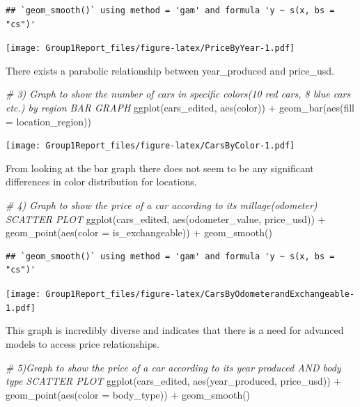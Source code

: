 \documentclass[
]{article}
\newenvironment{Shaded}{\begin{snugshade}}{\end{snugshade}}
\newcommand{\AttributeTok}[1]{\textcolor[rgb]{0.77,0.63,0.00}{#1}}
\newcommand{\CommentTok}[1]{\textcolor[rgb]{0.56,0.35,0.01}{\textit{#1}}}
\newcommand{\FunctionTok}[1]{\textcolor[rgb]{0.00,0.00,0.00}{#1}}
\newcommand{\NormalTok}[1]{#1}
\newcommand{\SpecialCharTok}[1]{\textcolor[rgb]{0.00,0.00,0.00}{#1}}
\begin{document}
\begin{verbatim}
## `geom_smooth()` using method = 'gam' and formula 'y ~ s(x, bs = "cs")'
\end{verbatim}

\texttt{[image: Group1Report\_files/figure-latex/PriceByYear-1.pdf]}

There exists a parabolic relationship between year\_produced and
price\_usd.

\begin{Shaded}
\begin{Highlighting}[]
\CommentTok{\# 3) Graph to show the number of cars in specific colors(10 red cars, 8 blue cars etc.) by region BAR GRAPH}
\FunctionTok{ggplot}\NormalTok{(cars\_edited, }\FunctionTok{aes}\NormalTok{(color)) }\SpecialCharTok{+} \FunctionTok{geom\_bar}\NormalTok{(}\FunctionTok{aes}\NormalTok{(}\AttributeTok{fill =}\NormalTok{ location\_region))}
\end{Highlighting}
\end{Shaded}

\texttt{[image: Group1Report\_files/figure-latex/CarsByColor-1.pdf]}

From looking at the bar graph there does not seem to be any significant
differences in color distribution for locations.

\begin{Shaded}
\begin{Highlighting}[]
\CommentTok{\# 4) Graph to show the price of a car according to its millage(odometer) SCATTER PLOT}
\FunctionTok{ggplot}\NormalTok{(cars\_edited, }\FunctionTok{aes}\NormalTok{(odometer\_value, price\_usd)) }\SpecialCharTok{+} \FunctionTok{geom\_point}\NormalTok{(}\FunctionTok{aes}\NormalTok{(}\AttributeTok{color =}\NormalTok{ is\_exchangeable)) }\SpecialCharTok{+} \FunctionTok{geom\_smooth}\NormalTok{()}
\end{Highlighting}
\end{Shaded}

\begin{verbatim}
## `geom_smooth()` using method = 'gam' and formula 'y ~ s(x, bs = "cs")'
\end{verbatim}

\texttt{[image: Group1Report\_files/figure-latex/CarsByOdometerandExchangeable-1.pdf]}

This graph is incredibly diverse and indicates that there is a need for
advanced models to access price relationships.

\begin{Shaded}
\begin{Highlighting}[]
\CommentTok{\# 5)Graph to show the price of a car according to its year produced AND body type SCATTER PLOT}
\FunctionTok{ggplot}\NormalTok{(cars\_edited, }\FunctionTok{aes}\NormalTok{(year\_produced, price\_usd)) }\SpecialCharTok{+} \FunctionTok{geom\_point}\NormalTok{(}\FunctionTok{aes}\NormalTok{(}\AttributeTok{color =}\NormalTok{ body\_type)) }\SpecialCharTok{+} \FunctionTok{geom\_smooth}\NormalTok{()}
\end{Highlighting}
\end{Shaded}
\end{document}

